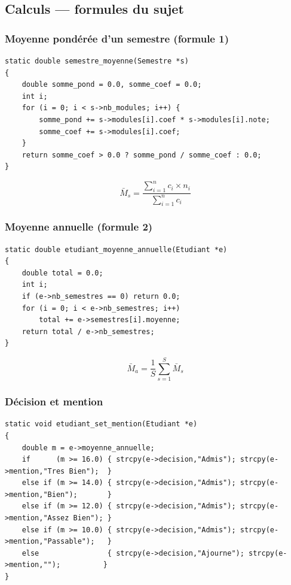 \documentclass[10pt,a4paper]{article}
\begin{document}
\subsection{Calculs --- formules du sujet}

\subsubsection{Moyenne pondérée d'un semestre (formule 1)}

\begin{lstlisting}[style=styleC, caption={Implémentation de la formule (1)}]
static double semestre_moyenne(Semestre *s)
{
    double somme_pond = 0.0, somme_coef = 0.0;
    int i;
    for (i = 0; i < s->nb_modules; i++) {
        somme_pond += s->modules[i].coef * s->modules[i].note;
        somme_coef += s->modules[i].coef;
    }
    return somme_coef > 0.0 ? somme_pond / somme_coef : 0.0;
}
\end{lstlisting}

$$\bar{M}_s = \frac{\displaystyle\sum_{i=1}^{n} c_i \times n_i}{\displaystyle\sum_{i=1}^{n} c_i}$$

\subsubsection{Moyenne annuelle (formule 2)}

\begin{lstlisting}[style=styleC, caption={Implémentation de la formule (2)}]
static double etudiant_moyenne_annuelle(Etudiant *e)
{
    double total = 0.0;
    int i;
    if (e->nb_semestres == 0) return 0.0;
    for (i = 0; i < e->nb_semestres; i++)
        total += e->semestres[i].moyenne;
    return total / e->nb_semestres;
}
\end{lstlisting}

$$\bar{M}_a = \frac{1}{S}\sum_{s=1}^{S} \bar{M}_s$$

\subsubsection{Décision et mention}

\begin{lstlisting}[style=styleC, caption={Attribution de la mention}]
static void etudiant_set_mention(Etudiant *e)
{
    double m = e->moyenne_annuelle;
    if      (m >= 16.0) { strcpy(e->decision,"Admis"); strcpy(e->mention,"Tres Bien");  }
    else if (m >= 14.0) { strcpy(e->decision,"Admis"); strcpy(e->mention,"Bien");       }
    else if (m >= 12.0) { strcpy(e->decision,"Admis"); strcpy(e->mention,"Assez Bien"); }
    else if (m >= 10.0) { strcpy(e->decision,"Admis"); strcpy(e->mention,"Passable");   }
    else                { strcpy(e->decision,"Ajourne"); strcpy(e->mention,"");          }
}
\end{lstlisting}
\end{document}
